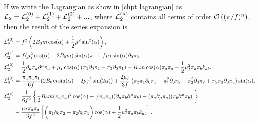 \documentclass{article}
\begin{document}
If we write the Lagrangian as show in \autoref{chpt lagrangian} as $\Ell_2 = \Ell_2^{(0)} + \Ell_2^{(1)} + \Ell_2^{(2)} +...$, where $\Ell_2^{(n)}$ contains all terms of order $\Oh[n]{(\pi/f)}$, then the result of the series expansion is
\begin{align}
\Ell_2^{(0)}
&  =
    f^2   
    \left(
        2B_0m \cos(\alpha )
        + \frac{1}{2} \mu^2 \sin^2(\alpha )
    \right),
    \label{L0}
\\
\label{L1}
\Ell_2^{(1)}
& =
    f 
    (
        \mu_I^2\cos (\alpha)
        - 2B_0m
    )\sin (\alpha) \pi_1 
    + f \mu_I \sin(\alpha) \partial_0\pi_2,
\\
\Ell_2^{(2)}
& =
    \frac{1}{2} \partial_\mu\pi_a\partial^\mu\pi_a
    + \mu_I \cos(\alpha) \left( \pi_1 \partial_0\pi_2 - \pi_2\partial_0\pi_1 \right)
    - B_0m \cos(\alpha) \pi_a \pi_a
    + \frac{1}{2} \mu_I ^2 \pi_a \pi_b k_{ab},
\label{L2}
\\
\label{L3}
\Ell_2^{(3)}
& =
    \frac{\pi_a\pi_a \pi_1}{6f}
    (2B_0m \sin (\alpha )-2\mu_I{}^2 \sin (2\alpha ))
    + 
    \frac{2 \mu_I}{3 f}
    \left(
        \pi_2 \pi_1\partial_0\pi_1
        - \pi_1^2 \partial_0\pi_2
        - \pi_3^2\partial_0\pi_2
        + \pi_2 \pi_3 \partial_0\pi_3
    \right)\sin (\alpha),
\\
\notag
\Ell_2^{(4)}
& =
\frac{1}{6f^2}
\curly{    
    \frac{1}{2} B_0m (\pi_a\pi_a)^2 \cos(\alpha)
    -
    \left[
        (\pi_a \pi_a) (\partial_\mu \pi_b \partial^\mu \pi_b )
        - (\pi_a \partial_\mu \pi_a)(\pi_b \partial^\mu \pi_b )
    \right]
}
\\
&
- \frac{\mu_I \pi_a\pi_a}{3f^2}
\left[
    \bigg(\pi_1\partial_0 \pi_2 - \pi_2 \partial_0 \pi_1\bigg) 
    \cos(\alpha)
    + \frac{1}{2} \mu_I ^2 \pi_a \pi_b k_{ab}
\right].
\label{L4}
\end{align}
\end{document}
